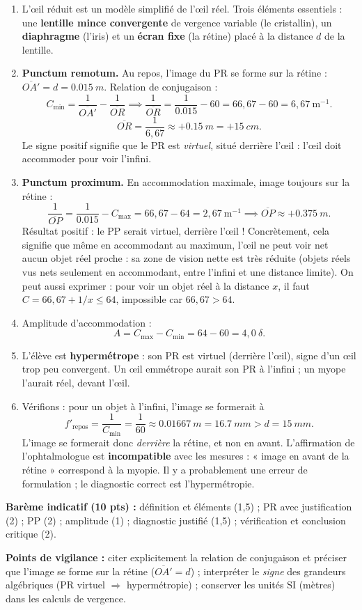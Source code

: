 \documentclass[11pt]{article}
\newcommand{\cle}[1]{{\popxbold\color{popdark}#1}}
\begin{document}
\begin{corrige}
\begin{enumerate}
\item L'\cle{œil réduit} est un modèle simplifié de l'œil réel. Trois éléments essentiels : une \textbf{lentille mince convergente} de vergence variable (le cristallin), un \textbf{diaphragme} (l'iris) et un \textbf{écran fixe} (la rétine) placé à la distance $d$ de la lentille.
\item \textbf{Punctum remotum.} Au repos, l'image du PR se forme sur la rétine : $\overline{OA'} = d = \SI{0,015}{m}$. Relation de conjugaison :
\[ C_{\min} = \frac{1}{\overline{OA'}} - \frac{1}{\overline{OR}} \implies \frac{1}{\overline{OR}} = \frac{1}{\num{0,015}} - 60 = 66,67 - 60 = 6,67\ \text{m}^{-1}. \]
\[ \overline{OR} = \frac{1}{6,67} \approx +\SI{0,15}{m} = +\SI{15}{cm}. \]
Le signe positif signifie que le PR est \emph{virtuel}, situé derrière l'œil : l'œil doit accommoder pour voir l'infini.
\item \textbf{Punctum proximum.} En accommodation maximale, image toujours sur la rétine :
\[ \frac{1}{\overline{OP}} = \frac{1}{\num{0,015}} - C_{\max} = 66,67 - 64 = 2,67\ \text{m}^{-1} \implies \overline{OP} \approx +\SI{0,375}{m}. \]
Résultat positif : le PP serait virtuel, derrière l'œil ! Concrètement, cela signifie que même en accommodant au maximum, l'œil ne peut voir net aucun objet réel proche : sa zone de vision nette est très réduite (objets réels vus nets seulement en accommodant, entre l'infini et une distance limite). On peut aussi exprimer : pour voir un objet réel à la distance $x$, il faut $C = 66,67 + 1/x \leq 64$, impossible car $66,67 > 64$.
\item Amplitude d'accommodation :
\[ A = C_{\max} - C_{\min} = 64 - 60 = 4,0\ \delta. \]
\item L'élève est \textbf{hypermétrope} : son PR est virtuel (derrière l'œil), signe d'un œil trop peu convergent. Un œil emmétrope aurait son PR à l'infini ; un myope l'aurait réel, devant l'œil.
\item Vérifions : pour un objet à l'infini, l'image se formerait à
\[ f'_{\text{repos}} = \frac{1}{C_{\min}} = \frac{1}{60} \approx \SI{0,01667}{m} = \SI{16,7}{mm} > d = \SI{15}{mm}. \]
L'image se formerait donc \emph{derrière} la rétine, et non en avant. L'affirmation de l'ophtalmologue est \textbf{incompatible} avec les mesures : « image en avant de la rétine » correspond à la myopie. Il y a probablement une erreur de formulation ; le diagnostic correct est l'hypermétropie.
\end{enumerate}
\textbf{Barème indicatif (10 pts) :} définition et éléments (1,5) ; PR avec justification (2) ; PP (2) ; amplitude (1) ; diagnostic justifié (1,5) ; vérification et conclusion critique (2).\par
\textbf{Points de vigilance :} citer explicitement la relation de conjugaison et préciser que l'image se forme sur la rétine ($\overline{OA'} = d$) ; interpréter le \emph{signe} des grandeurs algébriques (PR virtuel $\Rightarrow$ hypermétropie) ; conserver les unités SI (mètres) dans les calculs de vergence.
\end{corrige}
\end{document}
